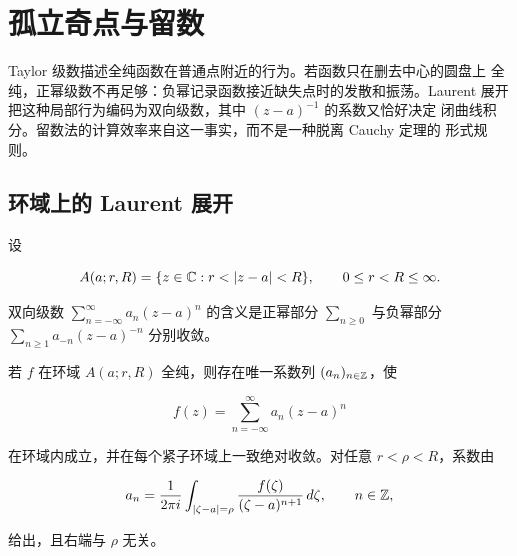 \chapter{孤立奇点与留数}
\label{chap:isolated-singularities-residues}

Taylor 级数描述全纯函数在普通点附近的行为。若函数只在删去中心的圆盘上
全纯，正幂级数不再足够：负幂记录函数接近缺失点时的发散和振荡。Laurent
展开把这种局部行为编码为双向级数，其中 \((z-a)^{-1}\) 的系数又恰好决定
闭曲线积分。留数法的计算效率来自这一事实，而不是一种脱离 Cauchy 定理的
形式规则。

\section{环域上的 Laurent 展开}

设

\[
 A(a;r,R)=\{z\in\C:r<|z-a|<R\},
 \qquad 0\le r<R\le\infty .
\]

双向级数 \(\sum_{n=-\infty}^{\infty}a_n(z-a)^n\) 的含义是正幂部分
\(\sum_{n\ge0}\) 与负幂部分 \(\sum_{n\ge1}a_{-n}(z-a)^{-n}\) 分别收敛。

\begin{theorem}
\label{thm:laurent-expansion}
若 \(f\) 在环域 \(A(a;r,R)\) 全纯，则存在唯一系数列
\((a_n)_{n\in\mathbb{Z}}\)，使

\begin{equation}
 f(z)=\sum_{n=-\infty}^{\infty}a_n(z-a)^n
 \label{eq:laurent-series}
\end{equation}

在环域内成立，并在每个紧子环域上一致绝对收敛。对任意
\(r<\rho<R\)，系数由

\begin{equation}
 a_n=\frac1{2\pi i}\int_{|\zeta-a|=\rho}
 \frac{f(\zeta)}{(\zeta-a)^{n+1}}\,d\zeta,
 \qquad n\in\mathbb{Z},
 \label{eq:laurent-coefficients}
\end{equation}

给出，且右端与 \(\rho\) 无关。
\end{theorem}

